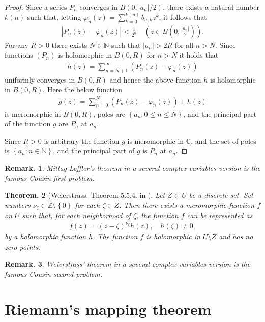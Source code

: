 \documentclass[openany, a4paper, oneside]{book}
\theoremstyle{break}
\newtheorem{thm}{Theorem.}[section]
\theoremstyle{breakdefn}
\newtheorem{rem}[thm]{Remark.}
\newcommand{\abs}[1]{\left|#1\right|}
\newcommand{\rbk}[1]{\left (#1\right)}
\newcommand{\cbk}[1]{\left\{#1\right\}}
\newcommand{\set}[2]{\left\{#1 : #2\right\}}
\newcommand{\bbC}{\mathbb{C}}
\newcommand{\bbN}{\mathbb{N}}
\newcommand{\bbZ}{\mathbb{Z}}
\begin{document}
\begin{proof}
Since a series $P_n$ converges in $B (0, \abs{a_n} / 2)$.
there exists a natural number $k (n)$ such that, letting $\varphi_n (z) = \sum_{k=0}^{k (n)} b_{n, k}z^k$, it follows that
\begin{align}
 \abs{P_n (z) - \varphi_n (z)}  < \frac{1}{2^n} \quad \rbk{z \in B (0, \frac{\abs{a_n}}{2})}.
\end{align}
For any $R>0$ there exists $N \in \bbN$ such that $\abs{a_n} > 2R$ for all $n > N$.
Since functions $(P_n)$ is holomorphic in $B (0,R)$ for $n > N$ it holds that
\begin{align}
 h (z)
 =
 \sum_{n = N + 1}^{\infty} \rbk{P_n (z) - \varphi_n (z)}
\end{align}
uniformly converges in $B (0, R)$ and hence the above function $h$ is holomorphic in $B (0, R)$.
Here the below function
\begin{align}
 g (z)
 =
 \sum_{n=0}^N \rbk{P_n (z) - \varphi_n (z)} + h (z)
\end{align}
is meromorphic in $B (0, R)$, poles are $\set{a_n}{0 \leq n \leq N}$,
and the principal part of the function $g$ are $P_n$ at $a_n$.

Since $R > 0$ is arbitrary the function $g$ is meromorphic in $\bbC$,
and the set of poles is $\set{a_n}{n \in \bbN}$,
and the principal part of $g$ is $P_n$ at $a_n$.
\end{proof}
\begin{rem}
 Mittag-Leffler's theorem in a several complex variables version is the famous Cousin first problem.
\end{rem}

\begin{thm}[Weierstrass. Theorem 5.5.4. in \cite{JunjiroNoguchi1}]
 Let $Z \subset U$ be a discrete set.
 Set numbers $\nu_{\zeta} \in \bbZ \setminus \cbk{0}$ for each $\zeta \in Z$.
 Then there exists a meromorphic function $f$ on $U$ such that, for each neighborhood of $\zeta$,
 the function $f$ can be represented as
 \begin{align}
  f (z)
  =
  (z - \zeta)^{\nu_{\zeta}} h (z), \quad h (\zeta) \neq 0,
 \end{align}
 by a holomorphic function $h$.
 The function $f$ is holomorphic in $U \setminus Z$ and has no zero points.
\end{thm}
\begin{rem}
 Weierstrass' theorem in a several complex variables version is the famous Cousin second problem.
\end{rem}
\section{Riemann's mapping theorem}
\label{sec-6-1-11}
\end{document}
